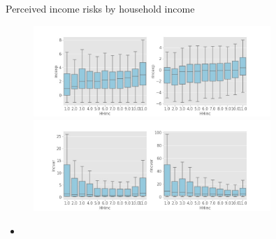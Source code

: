 \documentclass{beamer}
\begin{document}
\begin{frame}{Perceived income risks by household income}
	\begin{figure}
		\centering
		\label{boxplot_hhinc}
		\includegraphics[width=0.8\textwidth]{figures/boxplot_exp_HHinc} \\
		\includegraphics[width=0.8\textwidth]{figures/boxplot_var_HHinc}
	\end{figure}
	\begin{itemize}
		\item 
	\end{itemize}
\end{frame}
\end{document}

